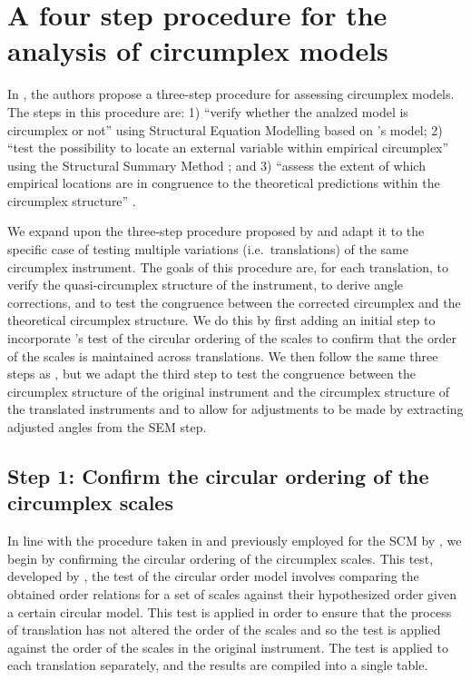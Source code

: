 \documentclass[
  authoryear,
  preprint,
  3p]{elsarticle}
\begin{document}
\section{A four step procedure for the analysis of circumplex
models}\label{a-four-step-procedure-for-the-analysis-of-circumplex-models}

In \citet{Rogoza2021three}, the authors propose a three-step procedure
for assessing circumplex models. The steps in this procedure are: 1)
``verify whether the analzed model is circumplex or not'' using
Structural Equation Modelling based on \citet{Browne1992Circumplex}'s
model; 2) ``test the possibility to locate an external variable within
empirical circumplex'' using the Structural Summary Method
\citep{Gurtman1994differentiating}; and 3) ``assess the extent of which
empirical locations are in congruence to the theoretical predictions
within the circumplex structure'' \citep{Rogoza2021three}.

We expand upon the three-step procedure proposed by
\citet{Rogoza2021three} and adapt it to the specific case of testing
multiple variations (i.e.~translations) of the same circumplex
instrument. The goals of this procedure are, for each translation, to
verify the quasi-circumplex structure of the instrument, to derive angle
corrections, and to test the congruence between the corrected circumplex
and the theoretical circumplex structure. We do this by first adding an
initial step to incorporate \citet{Rounds2000Tinsley}'s test of the
circular ordering of the scales to confirm that the order of the scales
is maintained across translations. We then follow the same three steps
as \citet{Rogoza2021three}, but we adapt the third step to test the
congruence between the circumplex structure of the original instrument
and the circumplex structure of the translated instruments and to allow
for adjustments to be made by extracting adjusted angles from the SEM
step.

\subsection{Step 1: Confirm the circular ordering of the circumplex
scales}\label{step-1-confirm-the-circular-ordering-of-the-circumplex-scales}

In line with the procedure taken in \citet{Gurtman2000Interpersonal} and
previously employed for the SCM by \citet{Lam2022Assessing}, we begin by
confirming the circular ordering of the circumplex scales. This test,
developed by \citet{Rounds2000Tinsley}, the test of the circular order
model involves comparing the obtained order relations for a set of
scales against their hypothesized order given a certain circular model.
This test is applied in order to ensure that the process of translation
has not altered the order of the scales and so the test is applied
against the order of the scales in the original instrument. The test is
applied to each translation separately, and the results are compiled
into a single table.
\end{document}
